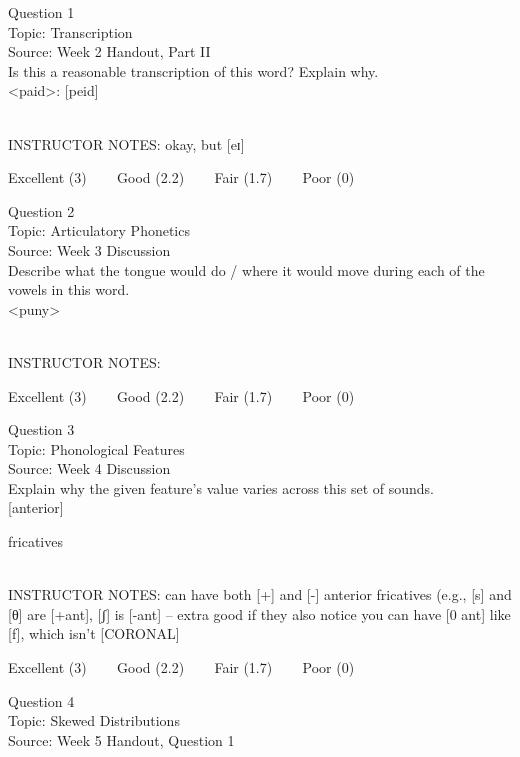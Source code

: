 \documentclass[12pt]{article}
\begin{document}
{\large Question 1}\\

Topic: Transcription\\
Source: Week 2 Handout, Part II\\

Is this a reasonable transcription of this word? Explain why.\\

<paid>: {[peid]}


~\\
INSTRUCTOR NOTES: okay, but [eɪ]


\vfill
Excellent (3) ~~~ Good (2.2) ~~~ Fair (1.7) ~~~ Poor (0)
\newpage

{\large Question 2}\\

Topic: Articulatory Phonetics\\
Source: Week 3 Discussion\\

Describe what the tongue would do / where it would move during each of the vowels in this word.\\

<puny>


~\\
INSTRUCTOR NOTES: 


\vfill
Excellent (3) ~~~ Good (2.2) ~~~ Fair (1.7) ~~~ Poor (0)
\newpage

{\large Question 3}\\

Topic: Phonological Features\\
Source: Week 4 Discussion\\

Explain why the given feature's value varies across this set of sounds.\\

{[anterior]}

fricatives


~\\
INSTRUCTOR NOTES: can have both [+] and [-] anterior fricatives (e.g., [s] and [θ] are [+ant], [ʃ] is [-ant] -- extra good if they also notice you can have [0 ant] like [f], which isn't [CORONAL]


\vfill
Excellent (3) ~~~ Good (2.2) ~~~ Fair (1.7) ~~~ Poor (0)
\newpage

{\large Question 4}\\

Topic: Skewed Distributions\\
Source: Week 5 Handout, Question 1\\
\end{document}
